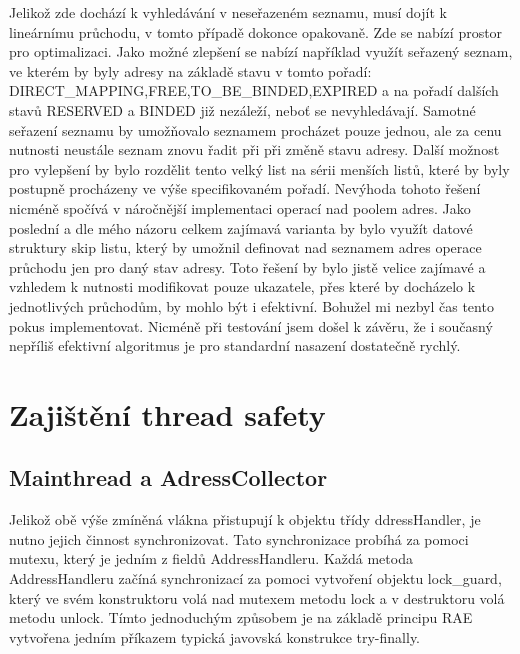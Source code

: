 \documentclass[12pt,a4paper]{report}
\begin{document}
Jelikož zde dochází k vyhledávání v neseřazeném seznamu, musí dojít k lineárnímu průchodu, v tomto případě dokonce opakovaně. Zde se nabízí prostor pro optimalizaci. Jako možné zlepšení se nabízí například využít seřazený seznam, ve kterém by byly adresy na základě stavu v tomto pořadí: DIRECT\_MAPPING,FREE,TO\_BE\_BINDED,EXPIRED a na pořadí dalších stavů RESERVED a BINDED již nezáleží, neboť se nevyhledávají. Samotné seřazení seznamu by umožňovalo seznamem procházet pouze jednou, ale za cenu nutnosti neustále seznam znovu řadit při při změně stavu adresy. Další možnost pro vylepšení by bylo rozdělit tento velký list na sérii menších listů, které by byly postupně procházeny ve výše specifikovaném pořadí. Nevýhoda tohoto řešení nicméně spočívá v náročnější implementaci operací nad poolem adres. Jako poslední a dle mého názoru celkem zajímavá varianta by bylo využít datové struktury skip listu, který by umožnil definovat nad seznamem adres operace průchodu jen pro daný stav adresy. Toto řešení by bylo jistě velice zajímavé a vzhledem k nutnosti modifikovat pouze ukazatele, přes které by docházelo k jednotlivých průchodům, by mohlo být i efektivní. Bohužel mi nezbyl čas tento pokus implementovat. Nicméně při testování jsem došel k závěru, že i současný nepříliš efektivní algoritmus je pro standardní nasazení dostatečně rychlý.
\section{Zajištění thread safety}
\subsection*{Mainthread a AdressCollector}
Jelikož obě výše zmíněná vlákna přistupují k objektu  třídy ddressHandler, je nutno jejich činnost synchronizovat. Tato synchronizace probíhá za pomoci mutexu, který je jedním z fieldů AddressHandleru. Každá metoda AddressHandleru začíná synchronizací za pomoci vytvoření objektu lock\_guard, který ve svém konstruktoru volá nad mutexem metodu lock a v destruktoru volá metodu unlock. Tímto jednoduchým způsobem je na základě principu RAE vytvořena jedním příkazem typická javovská konstrukce try-finally.
\end{document}
